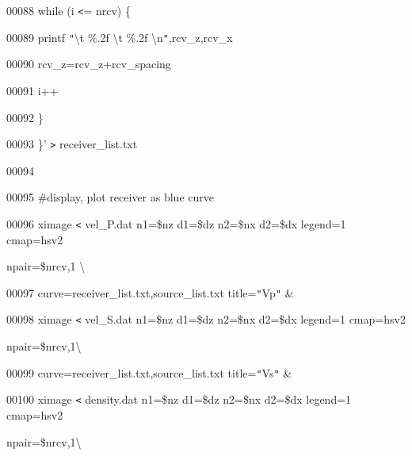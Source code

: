 \documentclass{article}
\begin{document}
\vspace{4pt}
00088      while (i \texttt{<}= nrcv) \{\label{l00089}

\vspace{4pt}
00089          printf \texttt{"}\textbackslash{}t \%.2f \textbackslash{}t \%.2f 
\textbackslash{}n\texttt{"},rcv\_z,rcv\_x \label{l00090}

\vspace{4pt}
00090                        rcv\_z=rcv\_z+rcv\_spacing\label{l00091}

\vspace{4pt}
00091          i++\label{l00092}

\vspace{4pt}
00092      \} \label{l00093}

\vspace{4pt}
00093 \}' \texttt{>} receiver\_list.txt\label{l00094}

\vspace{4pt}
00094 \label{l00095}

\vspace{4pt}
00095 \#display, plot receiver as blue curve\label{l00096}

\vspace{4pt}
00096 ximage \texttt{<} vel\_P.dat n1=\$nz d1=\$dz n2=\$nx d2=\$dx legend=1 cmap=hsv2 

\vspace{4pt}
\parindent=18pt
npair=\$nrcv,1 \textbackslash{}\label{l00097}

\vspace{4pt}
\parindent=0pt
00097            curve=receiver\_list.txt,source\_list.txt title=\texttt{"}Vp\texttt{"} 
\&\label{l00098}

\vspace{4pt}
00098 ximage \texttt{<} vel\_S.dat n1=\$nz d1=\$dz n2=\$nx d2=\$dx legend=1 cmap=hsv2 

\vspace{4pt}
\parindent=18pt
npair=\$nrcv,1\textbackslash{}\label{l00099}

\vspace{4pt}
\parindent=0pt
00099            curve=receiver\_list.txt,source\_list.txt title=\texttt{"}Vs\texttt{"} 
\&\label{l00100}

\vspace{4pt}
00100 ximage \texttt{<} density.dat n1=\$nz d1=\$dz n2=\$nx d2=\$dx legend=1 cmap=hsv2 

\vspace{4pt}
\parindent=18pt
npair=\$nrcv,1\textbackslash{}\label{l00101}
\end{document}
